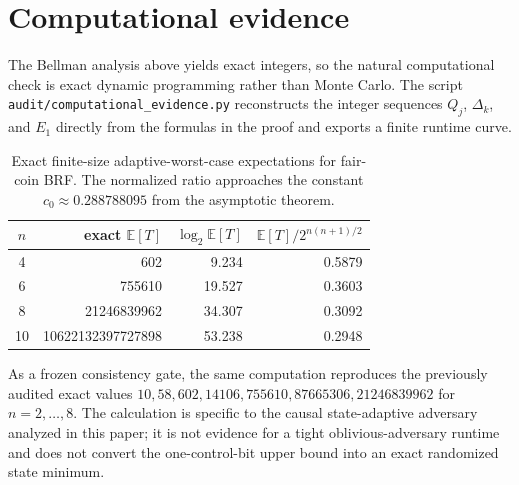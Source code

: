 \section{Computational evidence}\label{sec:computational-evidence}

The Bellman analysis above yields exact integers, so the natural computational check is exact dynamic programming rather than Monte Carlo.  The script \texttt{audit/computational\_evidence.py} reconstructs the integer sequences $Q_j$, $\Delta_k$, and $E_1$ directly from the formulas in the proof and exports a finite runtime curve.

\begin{table}[ht]
\centering
\begin{tabular}{c|r|r|r}
$n$ & exact $\mathbb E[T]$ & $\log_2\mathbb E[T]$ & $\mathbb E[T]/2^{n(n+1)/2}$ \\
\hline
4 & 602 & 9.234 & 0.5879 \\
6 & 755610 & 19.527 & 0.3603 \\
8 & 21246839962 & 34.307 & 0.3092 \\
10 & 10622132397727898 & 53.238 & 0.2948
\end{tabular}
\caption{Exact finite-size adaptive-worst-case expectations for fair-coin BRF.  The normalized ratio approaches the constant $c_0\approx0.288788095$ from the asymptotic theorem.}
\label{tab:brf-runtime-finite}
\end{table}

As a frozen consistency gate, the same computation reproduces the previously audited exact values $10,58,602,14106,755610,87665306,21246839962$ for $n=2,\ldots,8$.  The calculation is specific to the causal state-adaptive adversary analyzed in this paper; it is not evidence for a tight oblivious-adversary runtime and does not convert the one-control-bit upper bound into an exact randomized state minimum.
